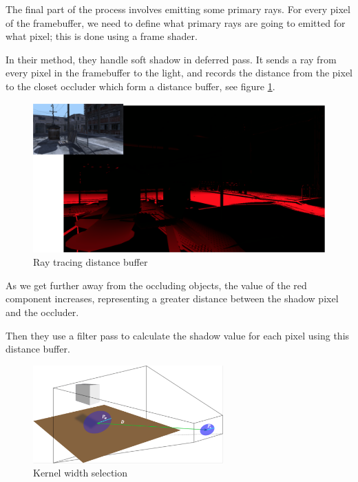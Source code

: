 The final part of the process involves emitting some primary rays. For every pixel of the framebuffer, we need to define what primary rays are going to emitted for what pixel; this is done using a frame shader.

In their method, they handle soft shadow in deferred pass. It sends a ray from every pixel in the framebuffer to the light, and records the distance from the pixel to the closet occluder which form a distance buffer, see figure \ref{f:distance-buffer}.

\begin{figure}\label{f:distance-buffer}
	\includegraphics[width=1.0\textwidth]{graphics/shadows/ray-tracing-distance-buffer}
	\caption{Ray tracing distance buffer}
\end{figure}

As we get further away from the occluding objects, the value of the red component increases, representing a greater distance between the shadow pixel and the occluder.

Then they use a filter pass to calculate the shadow value for each pixel using this distance buffer.

\begin{figure}
\sidecaption
	\includegraphics[width=0.65\textwidth]{graphics/shadows/kernel-width-section}
	\caption{Kernel width selection}
	\label{f:kernel-width-section}
\end{figure}

